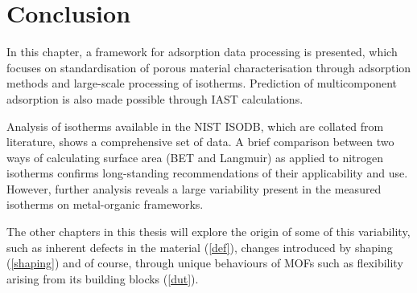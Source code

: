 
\section{Conclusion}

In this chapter, a framework for adsorption data processing is
presented, which focuses on standardisation of porous material
characterisation through adsorption methods and large-scale
processing of isotherms. Prediction of multicomponent
adsorption is also made possible through IAST calculations.

Analysis of isotherms available in the NIST ISODB, which are collated
from literature, shows a comprehensive set of data. A brief comparison
between two ways of calculating surface area (BET and Langmuir) as applied
to nitrogen isotherms confirms long-standing recommendations of their
applicability and use. However, further analysis reveals a large
variability present in the measured isotherms on metal-organic
frameworks.

The other chapters in this thesis will explore the origin of some of
this variability, such as inherent defects in the material (\autoref{def}),
changes introduced by shaping (\autoref{shaping}) and of course, through
unique behaviours of MOFs such as flexibility arising from its building
blocks (\autoref{dut}).

\FloatBarrier%
\pagebreak